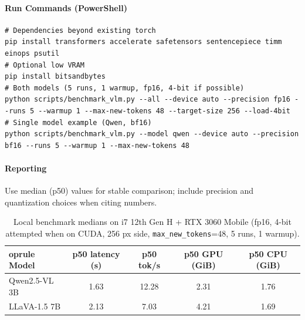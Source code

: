 \documentclass[11pt,a4paper]{article}
\newcommand{\code}[1]{\texttt{#1}}
\begin{document}
\paragraph{Run Commands (PowerShell)}
\begin{lstlisting}[style=code]
# Dependencies beyond existing torch
pip install transformers accelerate safetensors sentencepiece timm einops psutil
# Optional low VRAM
pip install bitsandbytes
# Both models (5 runs, 1 warmup, fp16, 4-bit if possible)
python scripts/benchmark_vlm.py --all --device auto --precision fp16 --runs 5 --warmup 1 --max-new-tokens 48 --target-size 256 --load-4bit
# Single model example (Qwen, bf16)
python scripts/benchmark_vlm.py --model qwen --device auto --precision bf16 --runs 5 --warmup 1 --max-new-tokens 48
\end{lstlisting}

\paragraph{Reporting}
Use median (p50) values for stable comparison; include precision and quantization choices when citing numbers.

\begin{table}[h]
\centering
\small
\begin{tabular}{l c c c c}
    	oprule
Model & p50 latency (s) & p50 tok/s & p50 GPU (GiB) & p50 CPU (GiB) \\
\midrule
Qwen2.5-VL 3B & 1.63 & 12.28 & 2.31 & 1.76 \\
LLaVA-1.5 7B & 2.13 & 7.03 & 4.21 & 1.69 \\
\bottomrule
\end{tabular}
\caption{Local benchmark medians on i7 12th Gen H + RTX 3060 Mobile (fp16, 4-bit attempted when on CUDA, 256 px side, \code{max\_new\_tokens}=48, 5 runs, 1 warmup).}
\label{tab:vlm-local-bench}
\end{table}
\end{document}

